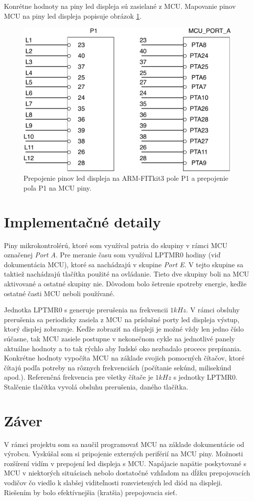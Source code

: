 \documentclass[a4paper, 10pt]{article}
\begin{document}
Konrétne hodnoty na piny led displeja sú zasielané z MCU. Mapovanie pinov MCU na piny led displeja popisuje obrázok \ref{mcu_to_led_scheme}.

\begin{figure}[H] 
	\centering
	\includegraphics[width=.5\paperwidth]{pin_map_scheme.pdf}
	\caption{Prepojenie pinov led displeja na ARM-FITkit3 pole P1 a prepojenie poľa P1 na MCU piny.}
	\label{mcu_to_led_scheme}
\end{figure}

\section{Implementačné detaily}
Piny mikrokontrolérú, ktoré som využíval patria do skupiny v rámci MCU označenej \textit{Port A}. Pre meranie času som využíval LPTMR0 hodiny (viď dokumentácia MCU), ktoré sa nachádzajú v skupine \textit{Port E}. V tejto skupine sa taktiež nachádzajú tlačítka použité na ovládanie. Tieto dve skupiny boli na MCU aktivované a ostatné skupiny nie. Dôvodom bolo šetrenie spotreby energie, keďže ostatné časti MCU neboli používané.

Jednotka LPTMR0 s generuje prerušenia na frekvencii $1kHz$. V rámci obsluhy prerušenia sa periodicky zasiela z MCU na príslušné porty led displeja výstup, ktorý displej zobrazuje. Keďže zobraziť na displeji je možné vždy len jedno číslo súčasne, tak MCU zasiele postupne v nekonečnom cykle na jednotlivé panely aktuálne hodnoty a to tak rýchlo aby ľudské oko nezbadalo procecs prepínania. Konkrétne hodnoty vypočíta MCU na základe svojich pomocných čítačov, ktoré čítajú podľa potreby na rôznych frekvenciách (počítanie sekúnd, milisekúnd apod.). Referenčná frekvencia pre všetky čítače je $1kHz$ s jednotky LPTMR0. Stalčenie tlačítka vyvolá obsluhu prerušenia, daného tlačítka. 

\section{Záver}
V rámci projektu som sa naučil programovať MCU na základe dokumentácie od výrobcu. Vyskúšal som si pripojenie externých periférií na MCU piny. Možnosti rozšírení vidím v prepojení led displeja s MCU. Napájacie napätie poskytované s MCU v niektorých situáciach nebolo dostatočné vzhľadom na dĺžku prepojovacích vodičov čo viedlo k slabšej viditeľnosti rozsvietených led diód na displeji. Riešením by bolo efektívnejšia (kratšia) prepojovacia sieť.
\end{document}
